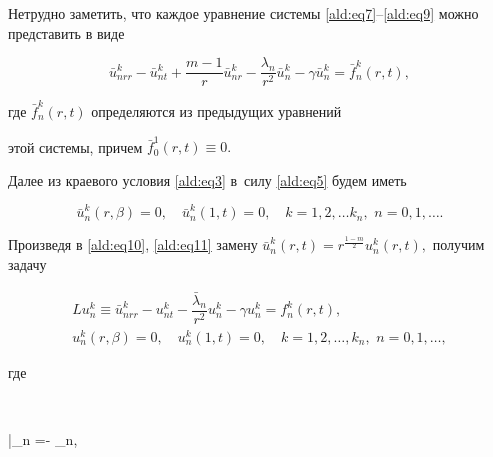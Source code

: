 Нетрудно заметить, что каждое уравнение системы \eqref{ald:eq7}--\eqref{ald:eq9} можно представить в виде

\begin{equation}

\bar {u}_{nrr}^{k} -\bar{u}_{nt}^k + {\dfrac{m - 1}{{r}}}\bar

{u}_{nr}^{k} - {\dfrac{{\lambda_{n}}}{{r^{2}}}}\bar{u}_{n}^{k} -

\gamma \bar{u}_n^k = \bar{f}_{n}^{k}(r,t), 

\label{ald:eq10}

\end{equation}

где $\bar{f}_{n}^{k} (r,t)$ определяются из предыдущих уравнений

этой системы, причем $\bar{f}_{0}^{1}(r,t) \equiv 0.$

Далее из краевого условия \eqref{ald:eq3} в~силу \eqref{ald:eq5} будем иметь 

\begin{equation}

\bar{u}_n^k(r,\beta)= 0,\quad 

\bar{u}_{n}^k(1,t)= 0,\quad  k =1,2, \dots k_{n},\,\, n = 0, 1,\dots.

\label{ald:eq11}

\end{equation}



Произведя в \eqref{ald:eq10}, \eqref{ald:eq11} замену $\bar{u}_{n}^{k} (r,t)= r^{\frac{1-m}{2}}u_{n}^{k} (r,t),$ получим задачу

\begin{gather}

L u_n^k \equiv \bar u_{nrr}^{k} - u_{nt}^k - {\dfrac{\bar \lambda{

_{n}} }{{r^{2}}}}u_{n}^{k} - \gamma u_n^k = f_{n}^{k} (r,t),

\label{ald:eq12}

\\

\label{ald:eq13}

u_n^k(r,\beta)= 0,\quad 

u_{n}^k(1,t)=0,\quad 

 k = 1,2, \dots, k_{n},\, \, n = 0,1,\dots,

\end{gather}

где

$$

\bar{\lambda}_{n} =- \lambda_{n},

